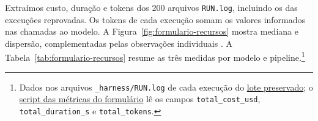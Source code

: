\documentclass[a4paper,12pt,twoside,english,brazilian]{book}
\begin{document}
Extraímos custo, duração e tokens dos 200 arquivos \texttt{RUN.log},
incluindo os das execuções reprovadas. Os tokens de cada execução somam os
valores informados nas chamadas ao modelo. A Figura~\ref{fig:formulario-recursos}
mostra mediana e dispersão, complementadas pelas observações individuais
\citep{nistBoxplot}.
A Tabela~\ref{tab:formulario-recursos} resume as três medidas por modelo e pipeline.\footnote{Dados nos arquivos \texttt{\_harness/RUN.log} de cada execução do \href{https://github.com/Educg550/tcc/tree/ee6d001c1f618419c6184644d18aa97bb33bcf9a/demos/runs/batch}{lote preservado}; o \href{https://github.com/Educg550/tcc/blob/ee6d001c1f618419c6184644d18aa97bb33bcf9a/tex/figuras/graficos-formulario.py}{script das métricas do formulário} lê os campos \texttt{total\_cost\_usd}, \texttt{total\_duration\_s} e \texttt{total\_tokens}.}
\end{document}
